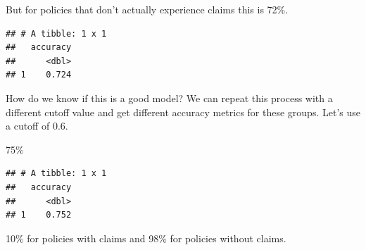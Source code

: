 \documentclass[]{book}
\newenvironment{Shaded}{\begin{snugshade}}{\end{snugshade}}
\newcommand{\DataTypeTok}[1]{\textcolor[rgb]{0.13,0.29,0.53}{#1}}
\newcommand{\DecValTok}[1]{\textcolor[rgb]{0.00,0.00,0.81}{#1}}
\newcommand{\KeywordTok}[1]{\textcolor[rgb]{0.13,0.29,0.53}{\textbf{#1}}}
\newcommand{\NormalTok}[1]{#1}
\newcommand{\OperatorTok}[1]{\textcolor[rgb]{0.81,0.36,0.00}{\textbf{#1}}}
\newcommand{\StringTok}[1]{\textcolor[rgb]{0.31,0.60,0.02}{#1}}
\begin{document}
But for policies that don't actually experience claims this is 72\%.

\begin{Shaded}
\end{Shaded}

\begin{verbatim}
## # A tibble: 1 x 1
##   accuracy
##      <dbl>
## 1    0.724
\end{verbatim}

How do we know if this is a good model? We can repeat this process with a different cutoff value and get different accuracy metrics for these groups. Let's use a cutoff of 0.6.

75\%

\begin{Shaded}
\end{Shaded}

\begin{verbatim}
## # A tibble: 1 x 1
##   accuracy
##      <dbl>
## 1    0.752
\end{verbatim}

10\% for policies with claims and 98\% for policies without claims.

\begin{Shaded}
\end{Shaded}
\end{document}

